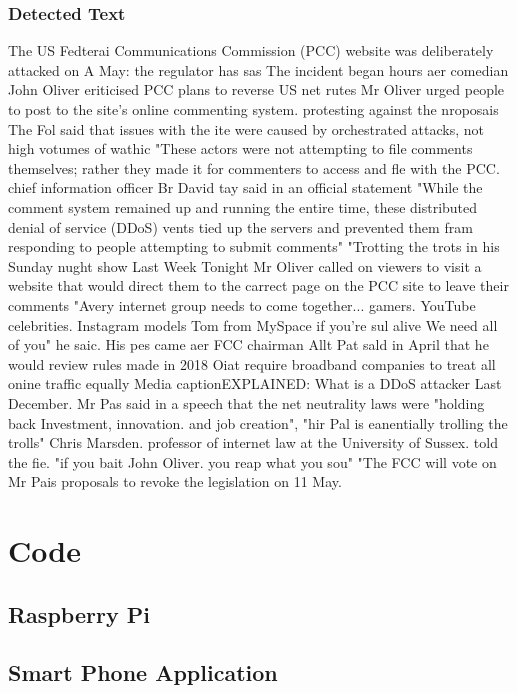 \subsubsection{Detected Text}
The US Fedterai Communications Commission (PCC) website was deliberately attacked on A
May: the regulator has sas
The incident began hours aer comedian John Oliver eriticised PCC plans to reverse US net
rutes
Mr Oliver urged people to post to the site's online commenting system. protesting against
the nroposais
The Fol said that issues with the ite were caused by orchestrated attacks, not high
votumes of wathic
"These actors were not attempting to file comments themselves; rather they made it
for commenters to access and fle with the PCC. chief information officer
Br David tay said in an official statement
"While the comment system remained up and running the entire time, these distributed
denial of service (DDoS)  vents tied up the servers and prevented them fram responding to
people attempting to submit comments"
"Trotting the trots
in his Sunday nught show Last Week Tonight Mr Oliver called on viewers to visit a website
that would direct them to the carrect page on the PCC site to leave their comments
"Avery internet group needs to come together... gamers. YouTube celebrities. Instagram
models Tom from MySpace if you're sul alive We need all of you" he saic.
His pes came aer FCC chairman Allt Pat sald in April that he would review rules made in
2018 Oiat require broadband companies to treat all onine traffic equally
Media captionEXPLAINED: What is a DDoS attacker
Last December. Mr Pas said in a speech that the net neutrality laws were "holding back
Investment, innovation. and job creation",
"hir Pal is eanentially trolling the trolls" Chris Marsden. professor of internet law at the
University of Sussex. told the fie.
"if you bait John Oliver. you reap what you sou"
"The FCC will vote on Mr Pais proposals to revoke the legislation on 11 May.

\pagebreak

\section{Code}
\subsection{Raspberry Pi}


\subsection{Smart Phone Application}

